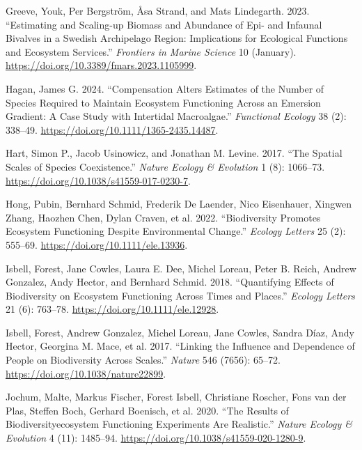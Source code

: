 \documentclass[
  letterpaper,
  DIV=11,
  numbers=noendperiod]{scrartcl}
\newlength{\cslhangindent}
\newenvironment{CSLReferences}[2] %
 {\begin{list}{}{%
  \setlength{\itemindent}{0pt}
  \setlength{\leftmargin}{0pt}
  \setlength{\parsep}{0pt}
  \ifodd #1
   \setlength{\leftmargin}{\cslhangindent}
   \setlength{\itemindent}{-1\cslhangindent}
  \fi
  \setlength{\itemsep}{#2\baselineskip}}}
 {\end{list}}
\begin{document}
\begin{CSLReferences}{1}{0}
Greeve, Youk, Per Bergström, Åsa Strand, and Mats Lindegarth. 2023.
{``Estimating and Scaling-up Biomass and Abundance of Epi- and Infaunal
Bivalves in a Swedish Archipelago Region: Implications for Ecological
Functions and Ecosystem Services.''} \emph{Frontiers in Marine Science}
10 (January). \url{https://doi.org/10.3389/fmars.2023.1105999}.

Hagan, James G. 2024. {``Compensation Alters Estimates of the Number of
Species Required to Maintain Ecosystem Functioning Across an Emersion
Gradient: A Case Study with Intertidal Macroalgae.''} \emph{Functional
Ecology} 38 (2): 338--49. \url{https://doi.org/10.1111/1365-2435.14487}.

Hart, Simon P., Jacob Usinowicz, and Jonathan M. Levine. 2017. {``The
Spatial Scales of Species Coexistence.''} \emph{Nature Ecology \&
Evolution} 1 (8): 1066--73.
\url{https://doi.org/10.1038/s41559-017-0230-7}.

Hong, Pubin, Bernhard Schmid, Frederik De Laender, Nico Eisenhauer,
Xingwen Zhang, Haozhen Chen, Dylan Craven, et al. 2022. {``Biodiversity
Promotes Ecosystem Functioning Despite Environmental Change.''}
\emph{Ecology Letters} 25 (2): 555--69.
\url{https://doi.org/10.1111/ele.13936}.

Isbell, Forest, Jane Cowles, Laura E. Dee, Michel Loreau, Peter B.
Reich, Andrew Gonzalez, Andy Hector, and Bernhard Schmid. 2018.
{``Quantifying Effects of Biodiversity on Ecosystem Functioning Across
Times and Places.''} \emph{Ecology Letters} 21 (6): 763--78.
\url{https://doi.org/10.1111/ele.12928}.

Isbell, Forest, Andrew Gonzalez, Michel Loreau, Jane Cowles, Sandra
Díaz, Andy Hector, Georgina M. Mace, et al. 2017. {``Linking the
Influence and Dependence of People on Biodiversity Across Scales.''}
\emph{Nature} 546 (7656): 65--72.
\url{https://doi.org/10.1038/nature22899}.

Jochum, Malte, Markus Fischer, Forest Isbell, Christiane Roscher, Fons
van der Plas, Steffen Boch, Gerhard Boenisch, et al. 2020. {``The
Results of Biodiversity{\textendash}ecosystem Functioning Experiments
Are Realistic.''} \emph{Nature Ecology \& Evolution} 4 (11): 1485--94.
\url{https://doi.org/10.1038/s41559-020-1280-9}.


\end{CSLReferences}
\end{document}
